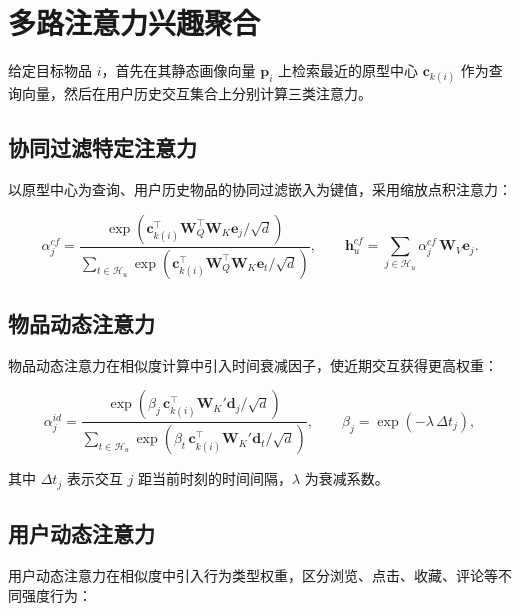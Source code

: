 \section{多路注意力兴趣聚合}
\label{sec:multi-attention}

给定目标物品 $i$，首先在其静态画像向量 $\mathbf{p}_i$ 上检索最近的原型中心 $\mathbf{c}_{k(i)}$ 作为查询向量，然后在用户历史交互集合上分别计算三类注意力。

\subsection{协同过滤特定注意力}
\label{subsec:cf-attention}

以原型中心为查询、用户历史物品的协同过滤嵌入为键值，采用缩放点积注意力：

\begin{equation}
  \alpha_{j}^{cf} = \frac{\exp\left(\mathbf{c}_{k(i)}^{\top}\mathbf{W}_Q^{\top}\mathbf{W}_K\mathbf{e}_j / \sqrt{d}\right)}
  {\sum_{t\in\mathcal{H}_u}\exp\left(\mathbf{c}_{k(i)}^{\top}\mathbf{W}_Q^{\top}\mathbf{W}_K\mathbf{e}_t / \sqrt{d}\right)},
  \qquad
  \mathbf{h}_u^{cf} = \sum_{j\in\mathcal{H}_u}\alpha_j^{cf}\,\mathbf{W}_V\mathbf{e}_j .
  \label{eq:cf-attention}
\end{equation}

\subsection{物品动态注意力}
\label{subsec:item-dynamic-attention}

物品动态注意力在相似度计算中引入时间衰减因子，使近期交互获得更高权重：

\begin{equation}
  \alpha_{j}^{id} = \frac{\exp\left(\beta_j\,\mathbf{c}_{k(i)}^{\top}\mathbf{W}_K'\mathbf{d}_j / \sqrt{d}\right)}
  {\sum_{t\in\mathcal{H}_u}\exp\left(\beta_t\,\mathbf{c}_{k(i)}^{\top}\mathbf{W}_K'\mathbf{d}_t / \sqrt{d}\right)},
  \qquad
  \beta_j = \exp\left(-\lambda\,\Delta t_j\right),
  \label{eq:item-attention}
\end{equation}

其中 $\Delta t_j$ 表示交互 $j$ 距当前时刻的时间间隔，$\lambda$ 为衰减系数。

\subsection{用户动态注意力}
\label{subsec:user-dynamic-attention}

用户动态注意力在相似度中引入行为类型权重，区分浏览、点击、收藏、评论等不同强度行为：

